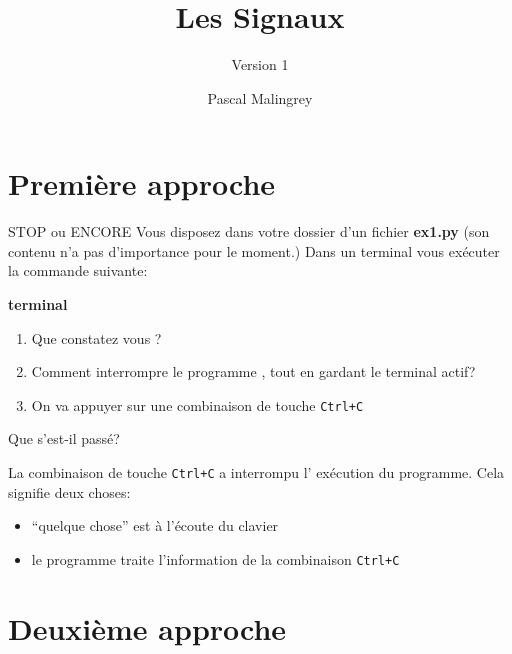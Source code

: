 \documentclass[9pt]{beamer}
\title{Les Signaux}
\subtitle{Version 1}
\author{Pascal Malingrey}
\institute{Académie Strasbourg}
\newenvironment{code}[1]{%
    \begin{bclogo}[couleur=backcolour, couleurTexte=black ,couleurBord=blue ,couleurBarre=black, ombre=false,epBord=0.9,logo=\#,arrondi=0.1]{{\bfseries #1}}%
    }%
    {%
    \end{bclogo}
}%
\begin{document}
\maketitle

\hypertarget{premiuxe8re-approche}{%
\section{Première approche}\label{premiuxe8re-approche}}

 {}

\begin{frame}{STOP ou ENCORE}
Vous disposez dans votre dossier d'un fichier \textbf{ex1.py} (son contenu n'a pas d'importance pour le moment.)
Dans un terminal vous exécuter la commande suivante:

\begin{code}{terminal}
\exe
\end{code}

\begin{enumerate}[<+->]
\item Que constatez vous ?
\item Comment interrompre le programme , tout en gardant le terminal actif?
\item On va appuyer sur une combinaison de touche \texttt{Ctrl+C}
\end{enumerate}

\end{frame}

\begin{frame}{Que s'est-il passé?}

La combinaison de touche \texttt{Ctrl+C} a interrompu l' exécution du programme.
Cela signifie deux choses:

\begin{itemize}
\item ``quelque chose'' est à l'écoute du clavier
\item le programme traite l'information de la combinaison \texttt{Ctrl+C}
\end{itemize}

\end{frame}
\section{Deuxième approche}
\end{document}
